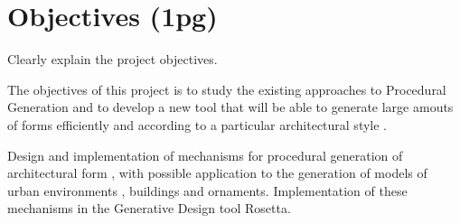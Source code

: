 
% 
% 

\section{Objectives (1pg)}

Clearly explain the project objectives.

The objectives of this project is to study the existing approaches to Procedural Generation and to develop a new tool that will be able to generate large amouts of forms efficiently and according to a particular architectural style .



Design and implementation of mechanisms for procedural generation of architectural form , with possible application to the generation of models of urban environments , buildings and ornaments. Implementation of these mechanisms in the Generative Design tool Rosetta.


